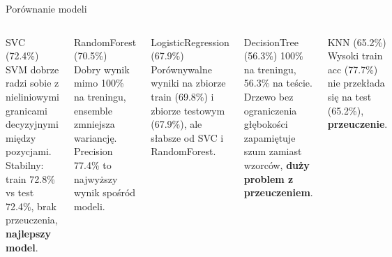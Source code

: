 \documentclass[aspectratio=169]{beamer}
\begin{document}
\begin{frame}{Porównanie modeli}
    
    \begin{columns}[T]
        \begin{alertblock}{SVC (72.4\%)}
            SVM dobrze radzi sobie z nieliniowymi granicami decyzyjnymi między pozycjami. Stabilny: train 72.8\% vs test 72.4\%, brak przeuczenia, \textbf{najlepszy model}.
        \end{alertblock}
        
        \begin{alertblock}{RandomForest (70.5\%)}
            Dobry wynik mimo 100\% na treningu, ensemble zmniejsza wariancję. Precision 77.4\% to najwyższy wynik spośród modeli.
        \end{alertblock}
        

        \begin{alertblock}{LogisticRegression (67.9\%)}
            Porównywalne wyniki na zbiorze train (69.8\%) i zbiorze testowym (67.9\%), ale słabsze od SVC i RandomForest.
        \end{alertblock}
        
        \begin{alertblock}{DecisionTree (56.3\%)}
            100\% na treningu, 56.3\% na teście. Drzewo bez ograniczenia głębokości zapamiętuje szum zamiast wzorców, \textbf{duży problem z przeuczeniem}.
        \end{alertblock}
        
        \begin{alertblock}{KNN (65.2\%)}
            Wysoki train acc (77.7\%) nie przekłada się na test (65.2\%), \textbf{przeuczenie}.
        \end{alertblock}
    \end{columns}
\end{frame}
\end{document}
